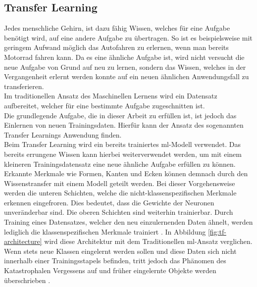 \documentclass[oneside]{ausarbeitung}
\begin{document}
\subsection{Transfer Learning}
Jedes menschliche Gehirn, ist dazu fähig Wissen, welches für eine Aufgabe benötigt wird, auf eine andere Aufgabe zu übertragen. So ist es beispielsweise mit geringem Aufwand möglich das Autofahren zu erlernen, wenn man bereits Motorrad fahren kann. Da es eine ähnliche Aufgabe ist, wird nicht versucht die neue Aufgabe von Grund auf neu zu lernen, sondern das Wissen, welches in der Vergangenheit erlernt werden konnte auf ein neuen ähnlichen Anwendungsfall zu transferieren.\\
Im traditionellen Ansatz des Maschinellen Lernens wird ein Datensatz aufbereitet, welcher für eine bestimmte Aufgabe zugeschnitten ist.\\
Die grundlegende Aufgabe, die in dieser Arbeit zu erfüllen ist, ist jedoch das Einlernen von neuen Trainingsdaten. Hierfür kann der Ansatz des sogenannten Transfer Learnings Anwendung finden.\\
Beim Transfer Learning wird ein bereits trainiertes \ac{ml}-Modell verwendet. Das bereits errungene Wissen kann hierbei weiterverwendet werden, um mit einem kleineren Trainingsdatensatz eine neue ähnliche Aufgabe erfüllen zu können. Erkannte Merkmale wie Formen, Kanten und Ecken können demnach durch den Wissenstransfer mit einem Modell geteilt werden. Bei dieser Vorgehensweise werden die unteren Schichten, welche die nicht-klassenspezifischen Merkmale erkennen eingefroren. Dies bedeutet, dass die Gewichte der Neuronen unveränderbar sind. Die oberen Schichten sind weiterhin trainierbar. Durch Training eines Datensatzes, welcher den neu einzulernenden Daten ähnelt, werden lediglich die klassenspezifischen Merkmale trainiert \cite{Senchanka2019}. In Abbildung \ref{fig:tf-architecture} wird diese Architektur mit dem Traditionellen \ac{ml}-Ansatz verglichen.\\
Wenn stets neue Klassen eingelernt werden sollen und diese Daten sich nicht innerhalb einer Trainingsstapels befinden, tritt jedoch das Phänomen des Katastrophalen Vergessens auf und früher eingelernte Objekte werden überschrieben \cite{cl-vs-tl}.
\end{document}
